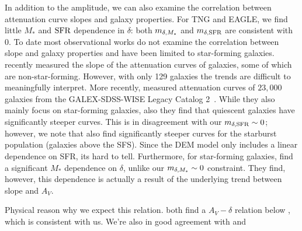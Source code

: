 In addition to the amplitude, we can also examine the correlation between
attenuation curve slopes and galaxy properties. For TNG and EAGLE, we find
little $M_*$ and ${\rm SFR}$ dependence in $\delta$: both $m_{\delta,M_*}$ and $m_{\delta,{\rm SFR}}$
are consistent with 0. To date most observational works do not examine the
correlation between slope and galaxy properties and have been limited to
star-forming galaxies. \cite{leja2017} recently measured the slope of the 
attenuation curves of galaxies, some of which are non-star-forming. However,
with only 129 galaxies the trends are difficult to meaningfully interpret.
More recently, \cite{salim2018} measured attenuation curves of $23,000$ 
galaxies from the GALEX-SDSS-WISE Legacy Catalog 2~\cite{salim2019}. While they
also mainly focus on star-forming galaxies, \cite{salim2018} also they find 
that quiescent galaxies have significantly steeper curves. This is in
disagreement with our $m_{\delta,{\rm SFR}}\sim0$; however, we note that \cite{salim2018} 
also find significantly steeper curves for the starburst population 
(galaxies above the SFS). Since the DEM model only includes a linear dependence
on SFR, its hard to tell. Furthermore, for star-forming galaxies,
\cite{salim2018} find a significant $M_*$ dependence on $\delta$, unlike our
$m_{\delta,M_*}\sim0$ constraint. They find, however, this dependence is actually a
result of the underlying trend between slope and $A_V$.

Physical reason why we expect this relation.%
\cite{leja2017, salim2018} both find a $A_V - \delta$ relation below
\cite{chevallard2013}, which is consistent with us. 
We're also in good agreement with \cite{witt2000} and \cite{salmon2016}

